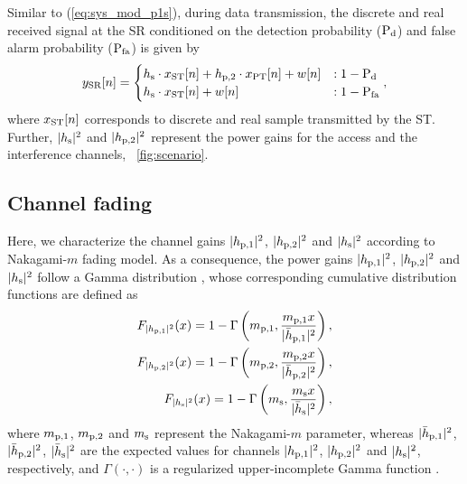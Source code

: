 Similar to (\ref{eq:sys_mod_p1s}), during data transmission, the discrete and real received signal at the SR conditioned on the detection probability ($\text{P}_{\text{d}}$) and false alarm probability ($\text{P}_{\text{fa}}$) is given by
\begin{equation}
\ys[n] = 
\begin{cases}
\hs \cdot \xs[n] + \hpt \cdot \xp[n] + w[n] & : 1 - \pd \\
\hs \cdot \xs[n] + w[n] & : 1 - \pfa
\end{cases},
\label{eq:sys_mod_ss}
\end{equation}
where $x_{\text{ST}}[n]$ corresponds to discrete and real sample transmitted by the ST. Further, $|h_{\text{s}}|^2$ and $|h_{\text{p,2}}|^2$ represent the power gains for the access and the interference channels,  \figurename~\ref{fig:scenario}. 


\subsection{Channel fading}
Here, we characterize the channel gains $|h_{\text{p,1}}|^2$, $|h_{\text{p,2}}|^2$ and $|h_{\text{s}}|^2$ according to Nakagami-$m$ fading model. As a consequence, the power gains $|h_{\text{p,1}}|^2$, $|h_{\text{p,2}}|^2$ and $|h_{\text{s}}|^2$ follow a Gamma distribution \cite{Goldsmith05}, whose corresponding cumulative distribution functions are defined as
\begin{align}
\fphpo(x) = 1 - \Gamma\left(\mpo, \frac{\mpo x}{\bphpo}\right), \label{eq:dis_phpo}\\
\fphpt(x) = 1 - \Gamma\left(\mpt, \frac{\mpt x}{\bphpt}\right), \label{eq:dis_pght}\\  
\fphs(x) = 1 - \Gamma\left(\ms , \frac{\ms x}{\bphs}\right), \label{eq:dis_phs}
\end{align}
where $m_{\text{p,1}}$, $m_{\text{p,2}}$ and $m_{\text{s}}$ represent the Nakagami-$m$ parameter, whereas $|\bar{h}_{\text{p,1}}|^2$, $|\bar{h}_{\text{p,2}}|^2$, $|\bar{h}_{\text{s}}|^2$ are the expected values for channels $|h_{\text{p,1}}|^2$, $|h_{\text{p,2}}|^2$ and $|h_{\text{s}}|^2$, respectively, and $\Gamma(\cdot, \cdot)$ is a regularized upper-incomplete Gamma function \cite{abramo}.

